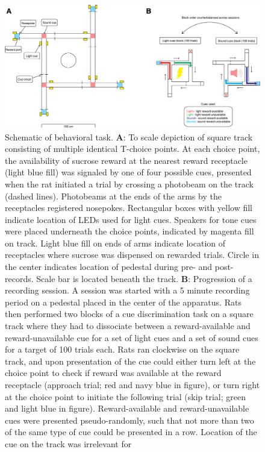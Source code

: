 \documentclass[11pt]{article}
\newcommand{\bsf}[1]{\textbf{#1}}
\begin{document}
\begin{figure}[h]
\centering
\includegraphics[width=\textwidth]{Fig 2 - Schematic task.png}
\caption{Schematic of behavioral task. \bsf{A}: To scale depiction of square
  track consisting of multiple identical T-choice points. At each choice point,
  the availability of sucrose reward at the nearest reward receptacle (light
  blue fill) was signaled by one of four possible cues, presented when the rat
  initiated a trial by crossing a photobeam on the track (dashed
  lines). Photobeams at the ends of the arms by the receptacles registered
  nosepokes. Rectangular boxes with yellow fill indicate location of LEDs used
  for light cues. Speakers for tone cues were placed underneath the choice
  points, indicated by magenta fill on track. Light blue fill on ends of arms
  indicate location of receptacles where sucrose was dispensed on rewarded
  trials. Circle in the center indicates location of pedestal during pre- and
  post-records. Scale bar is located beneath the track. \bsf{B}: Progression of
  a recording session. A session was started with a 5 minute recording period on
  a pedestal placed in the center of the apparatus. Rats then performed two
  blocks of a cue discrimination task on a square track where they had to
  dissociate between a reward-available and reward-unavailable cue for a set of
  light cues and a set of sound cues for a target of 100 trials each. Rats ran
  clockwise on the square track, and upon presentation of the cue could either
  turn left at the choice point to check if reward was available at the reward
  receptacle (approach trial; red and navy blue in figure), or turn right at the
  choice point to initiate the following trial (skip trial; green and light blue
  in figure). Reward-available and reward-unavailable cues were presented
  pseudo-randomly, such that not more than two of the same type of cue could be
  presented in a row. Location of the cue on the track was irrelevant for
}
\end{figure}
\end{document}
